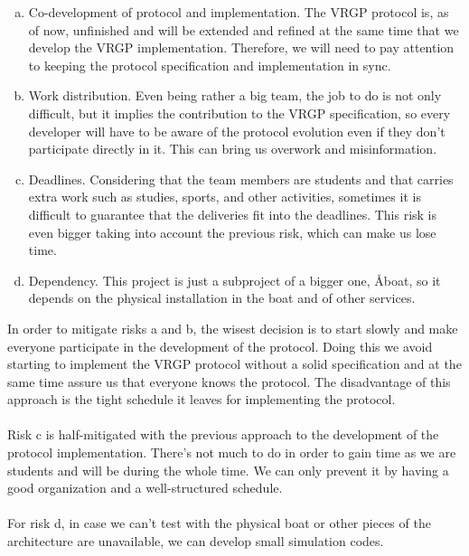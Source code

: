 \begin{enumerate}[a.]
	\item Co-development of protocol and implementation. The VRGP protocol is, as of now, unfinished and will be extended and refined at the same time that we develop the VRGP implementation. Therefore, we will need to pay attention to keeping the protocol specification and implementation in sync.
	\item Work distribution. Even being rather a big team, the job to do is not only difficult, but it implies the contribution to the VRGP specification, so every developer will have to be aware of the protocol evolution even if they don’t participate directly in it. This can bring us overwork and misinformation.
	\item Deadlines. Considering that the team members are students and that carries extra work such as studies, sports, and other activities, sometimes it is difficult to guarantee that the deliveries fit into the deadlines. This risk is even bigger taking into account the previous risk, which can make us lose time.
	\item Dependency. This project is just a subproject of a bigger one, Åboat, so it depends on the physical installation in the boat and of other services.
\end{enumerate}

\noindent
In order to mitigate risks a and b, the wisest decision is to start slowly and make everyone participate in the development of the protocol. Doing this we avoid starting to implement the VRGP protocol without a solid specification and at the same time assure us that everyone knows the protocol. The disadvantage of this approach is the tight schedule it leaves for implementing the protocol.
\\\\
Risk c is half-mitigated with the previous approach to the development of the protocol implementation. There’s not much to do in order to gain time as we are students and will be during the whole time. We can only prevent it by having a good organization and a well-structured schedule.
\\\\
For risk d, in case we can’t test with the physical boat or other pieces of the architecture are unavailable, we can develop small simulation codes.